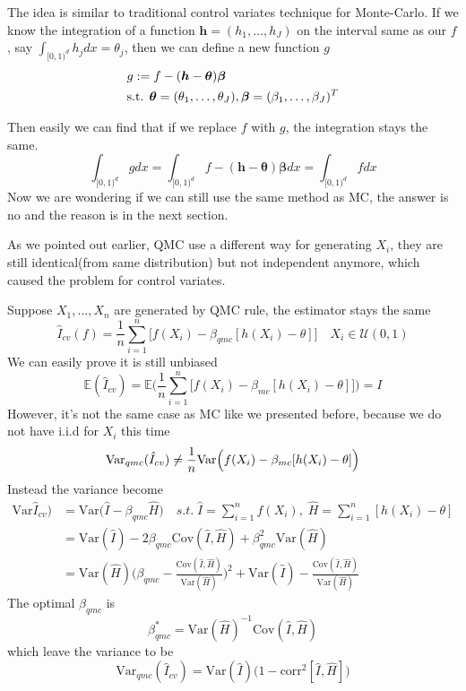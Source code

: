 

The idea is similar to traditional control variates technique for Monte-Carlo.
If we know the integration of a function $\boldsymbol{h}=(h_1,\dots,h_J)$ on the interval same as our $f$, say $\int_{[0,1)^d}h_jdx=\theta_j$, then we can define a new function $g$
\begin{align}\label{eq:defg}
    & g:=f-(\boldsymbol{h}-\boldsymbol{\theta})\boldsymbol{\beta}\\
    \notag
    &\text{s.t. }\boldsymbol{\theta}=(\theta_1,\dots,\theta_J),
    \boldsymbol{\beta}=(\beta_1,\dots,\beta_J)^T
\end{align}

Then easily we can find that if we replace $f$ with $g$, the integration stays the same.
\[
	\int_{[0,1)^d}gdx
        =\int_{[0,1)^d}f-(\boldsymbol{h}-\boldsymbol{\theta})\boldsymbol{\beta}dx
			=\int_{[0,1)^d}fdx
\]
Now we are wondering if we can still use the same method as MC, the answer is no and the reason is in the next section. 


As we pointed out earlier, QMC use a different way for generating $X_i$, they are still identical(from same distribution) but not independent anymore, which caused the problem for control variates.

Suppose $X_1, \dots, X_n$ are generated by QMC rule, the estimator stays the same
\[
    \hat{I}_{cv}(f)=\frac{1}{n}\sum_{i=1}^{n}\Big[ f(X_i)-\beta_{qmc}[h(X_i)-\theta] \Big] \quad X_i\in \mathcal{U}(0,1)
\]
We can easily prove it is still unbiased
\[
\mathbb{E}(\hat{I}_{cv})=\mathbb{E}\Big(\frac{1}{n}\sum_{i=1}^{n}\Big[f(X_i)-\beta_{mc}[h(X_i)-\theta] \Big] \Big)=I 
\]
However, it's not the same case as MC like we presented before, because we do not have i.i.d for $X_i$ this time
\[
\mathrm{Var}_{qmc}(\hat{I}_{cv}) \not=\frac{1}{n}\mathrm{Var}\Big(f(X_i)-\beta_{mc}[h(X_i)-\theta]\Big)\\
\]
Instead the variance become
\begin{align*}
    \mathrm{Var}\hat{I}_{cv})  
    &=\mathrm{Var}\Big( \hat{I}- \beta_{qmc}\hat{H}\Big)
    \quad s.t.\; \hat{I}=\sum_{i=1}^{n}f(X_i),\; \hat{H}=\sum_{i=1}^{n}[h(X_i)-\theta]\\
    &=\mathrm{Var}(\hat{I})-2\beta_{qmc}\mathrm{Cov}(\hat{I},\hat{H})+\beta_{qmc}^2\mathrm{Var}(\hat{H})\\
    &=\mathrm{Var}(\hat{H})\Big(\beta_{qmc}-\frac{\mathrm{Cov}(\hat{I},\hat{H})}{\mathrm{Var}(\hat{H})}\Big)^2+\mathrm{Var}(\hat{I})-\frac{\mathrm{Cov}(\hat{I},\hat{H})}{\mathrm{Var}(\hat{H})}
\end{align*}
The optimal $\beta_{qmc}$ is
\begin{equation}
    \beta_{qmc}^*= \mathrm{Var} (\hat{H})^{-1}\mathrm{Cov} (\hat{I}, \hat{H})
    \label{eq:optBetaqmc}
\end{equation}
which leave the variance to be
\[
    \mathrm{Var}_{qmc}(\hat{I}_{cv})=\mathrm{Var}(\hat{I})\big(1-\mathrm{corr}^2[\hat{I}, \hat{H}]\big)
\]

